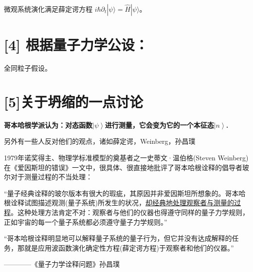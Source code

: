 微观系统演化满足薛定谔方程 $i\hbar\partial_t|\psi\rangle=\hat{H}|\psi\rangle$。

\section*{[4] 根据量子力学公设：}

全同粒子假设。
\section*{[5]关于坍缩的一点讨论}
\textbf{哥本哈根学派认为：对态函数$\left| \psi  \right\rangle $进行测量，它会变为它的一个本征态$\left| n  \right\rangle $.}\par
另外有一些人反对他们的观点，诸如薛定谔，Weinberg，孙昌璞\par
\begin{tcolorbox}[
	colback=white, %
	colframe=black, %
	arc=0pt, %
	boxsep=5pt, %
	left=10pt, %
	right=10pt, %
	top=10pt, %
	bottom=10pt, %
	width=\textwidth %
	]
	1979年诺奖得主、物理学标准模型的奠基者之一史蒂文·温伯格(Steven Weinberg)在《爱因斯坦的错误》一文中，很具体、很直接地批评了哥本哈根诠释的倡导者玻尔对于测量过程的不当处理：\par
	
	“量子经典诠释的玻尔版本有很大的瑕疵，其原因并非爱因斯坦所想象的。哥本哈根诠释试图描述观测(量子系统)所发生的状况，\underline{却经典地处理观察者与测量的过程}。这种处理方法肯定不对：观察者与他们的仪器也得遵守同样的量子力学规则，正如宇宙的每一个量子系统都必须遵守量子力学规则。”\par
	
	“哥本哈根诠释明显地可以解释量子系统的量子行为，但它并没有达成解释的任务，那就是应用波函数演化确定性方程(薛定谔方程)于观察者和他们的仪器。”\par
	\hfill————《量子力学诠释问题》孙昌璞
\end{tcolorbox}

